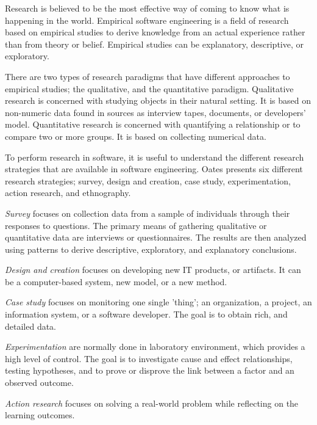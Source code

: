  Research is believed to be the most effective way of coming to know what is happening in the world\cite{bassey2003case}. Empirical software engineering is a field of research based on empirical studies to derive knowledge from an actual experience rather than from theory or belief\cite{empirical-research-SE}. Empirical studies can be explanatory, descriptive, or exploratory\cite{Wohlin:2000:ESE:330775}. 

 There are two types of research paradigms that have different approaches to empirical studies\cite{Wohlin:2000:ESE:330775}; the qualitative, and the quantitative paradigm. Qualitative research is concerned with studying objects in their natural setting\cite{Wohlin:2000:ESE:330775}. It is based on non-numeric data found in sources as interview tapes, documents, or developers' model. Quantitative research is concerned with quantifying a relationship or to compare two or more groups\cite{Wohlin:2000:ESE:330775}. It is based on collecting numerical data. 


To perform research in software, it is useful to understand the different research strategies that are available in software engineering. Oates\cite{Oates:2006:RIS:1202299} presents six different research strategies; survey, design and creation, case study, experimentation, action research, and ethnography. 

\textit{{Survey}} focuses on collection data from a sample of individuals through their responses to questions. The primary means of gathering qualitative or quantitative data are interviews or questionnaires. The results are then analyzed using patterns to derive descriptive, exploratory, and explanatory conclusions. 

\textit{{Design and creation}} focuses on developing new IT products, or artifacts. It can be a computer-based system, new model, or a new method. 

\textit{{Case study}} focuses on monitoring one single 'thing'; an organization, a project, an information system, or a software developer. The goal is to obtain rich, and detailed data. 

\textit{{Experimentation}} are normally done in laboratory environment, which provides a high level of control. The goal is to investigate cause and effect relationships, testing hypotheses, and to prove or disprove the link between a factor and an observed outcome. 

\textit{{Action research}} focuses on solving a real-world problem while reflecting on the learning outcomes. 

